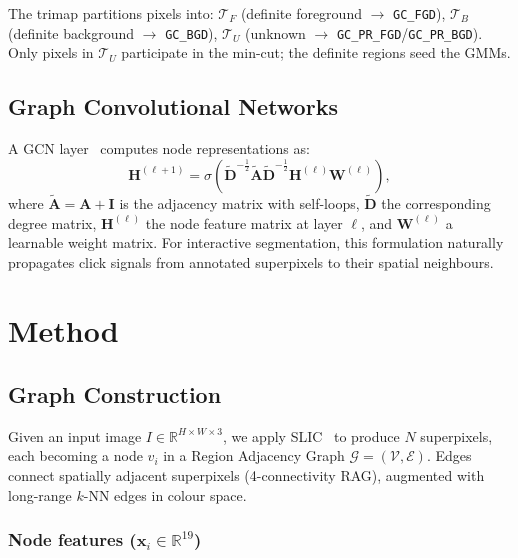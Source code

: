 \documentclass[11pt]{article}
\begin{document}
The trimap partitions pixels into:
$\mathcal{T}_F$ (definite foreground $\to$ \texttt{GC\_FGD}),
$\mathcal{T}_B$ (definite background $\to$ \texttt{GC\_BGD}),
$\mathcal{T}_U$ (unknown $\to$ \texttt{GC\_PR\_FGD}/\texttt{GC\_PR\_BGD}).
Only pixels in $\mathcal{T}_U$ participate in the min-cut; the definite regions seed the GMMs.

\subsection{Graph Convolutional Networks}

A GCN layer~\cite{kipf2017semi} computes node representations as:
\begin{equation}
  \mathbf{H}^{(\ell+1)}
  = \sigma\!\left(\tilde{\mathbf{D}}^{-\frac{1}{2}}
                  \tilde{\mathbf{A}}
                  \tilde{\mathbf{D}}^{-\frac{1}{2}}
                  \mathbf{H}^{(\ell)}
                  \mathbf{W}^{(\ell)}\right),
\end{equation}
where $\tilde{\mathbf{A}} = \mathbf{A} + \mathbf{I}$ is the adjacency matrix with self-loops,
$\tilde{\mathbf{D}}$ the corresponding degree matrix,
$\mathbf{H}^{(\ell)}$ the node feature matrix at layer $\ell$,
and $\mathbf{W}^{(\ell)}$ a learnable weight matrix.
For interactive segmentation, this formulation naturally propagates click signals from
annotated superpixels to their spatial neighbours.

\section{Method}

\subsection{Graph Construction}

Given an input image $I \in \mathbb{R}^{H \times W \times 3}$, we apply SLIC~\cite{achanta2012slic}
to produce $N$ superpixels, each becoming a node $v_i$ in a Region Adjacency Graph
$\mathcal{G} = (\mathcal{V}, \mathcal{E})$.
Edges connect spatially adjacent superpixels (4-connectivity RAG), augmented with long-range
$k$-NN edges in colour space.

\subsubsection*{Node features ($\mathbf{x}_i \in \mathbb{R}^{19}$)}
\end{document}
